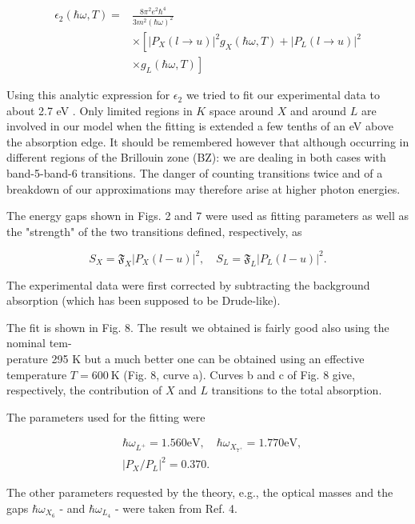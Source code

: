 \documentclass[10pt]{article}
\begin{document}
\begin{align*}
\epsilon_{2}(\hbar \omega, T)= & \frac{8 \pi^{2} e^{2} \hbar^{4}}{3 m^{2}(\hbar \omega)^{2}} \\
& \times\left[\left|P_{X}(l \rightarrow u)\right|^{2} g_{X}(\hbar \omega, T)+\left|P_{L}(l \rightarrow u)\right|^{2}\right. \\
& \left.\times g_{L}(\hbar \omega, T)\right] \tag{9}
\end{align*}


Using this analytic expression for $\epsilon_{2}$ we tried to fit our experimental data to about 2.7 eV . Only limited regions in $K$ space around $X$ and around $L$ are involved in our model when the fitting is extended a few tenths of an eV above the absorption edge. It should be remembered however that although occurring in different regions of the Brillouin zone (BZ): we are dealing in both cases with band-5-band-6 transitions. The danger of counting transitions twice and of a breakdown of our approximations may therefore arise at higher photon energies.

The energy gaps shown in Figs. 2 and 7 were used as fitting parameters as well as the "strength" of the two transitions defined, respectively, as


\begin{equation*}
S_{X}=\mathfrak{F}_{X}\left|P_{X}(l-u)\right|^{2}, \quad S_{L}=\mathfrak{F}_{L}\left|P_{L}(l-u)\right|^{2} . \tag{10}
\end{equation*}


The experimental data were first corrected by subtracting the background absorption (which has been supposed to be Drude-like).

The fit is shown in Fig. 8. The result we obtained is fairly good also using the nominal tem-\\
perature 295 K but a much better one can be obtained using an effective temperature $T=600 \mathrm{~K}$ (Fig. 8, curve a). Curves b and c of Fig. 8 give, respectively, the contribution of $X$ and $L$ transitions to the total absorption.

The parameters used for the fitting were

$$
\begin{aligned}
& \hbar \omega_{L^{+}}=1.560 \mathrm{eV}, \quad \hbar \omega_{X_{7^{+}}}=1.770 \mathrm{eV}, \\
& \left|P_{X} / P_{L}\right|^{2}=0.370 .
\end{aligned}
$$

The other parameters requested by the theory, e.g., the optical masses and the gaps $\hbar \omega_{X_{6}}$ - and $\hbar \omega_{L_{4}}$ - were taken from Ref. 4.
\end{document}
